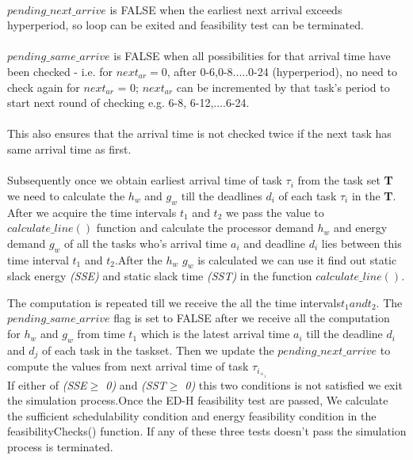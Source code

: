 \documentclass[12pt,hidelinks]{article}
\begin{document}
{\\$pending\_next\_arrive$ is FALSE when the earliest next arrival exceeds hyperperiod, so loop can be exited and feasibility test can be terminated.\\

\\$pending\_same\_arrive$  is FALSE when all possibilities for that arrival time have been checked - i.e. for $next_{ar} = 0$, after 0-6,0-8.....0-24 (hyperperiod), no need to check again for $next_{ar}$ = 0; $next_{ar}$ can be incremented by that task's period to start next round of checking e.g. 6-8, 6-12,....6-24.\\

\\This also ensures that the arrival time is not checked twice if the next task has same arrival time as first.\\

\\Subsequently once we obtain earliest arrival time of task {$\tau_i$} from the task set \textbf{T} we need to calculate the \textit{$h_w$} and \textit{$g_w$} till the deadlines {$d_i$} of each task {$\tau_i$} in the \textbf{T}.\\


After we acquire the time intervals $t_1 $ and $ t_2$ we pass the value to $calculate\_line()$ function and  calculate the  processor demand \textit{$h_w$} and energy demand \textit{$g_w$}  of all the tasks who's arrival time {$a_i$} and deadline {$d_i$} lies between this time interval $t_1$ and $t_2$.After the \textit{$h_w$} \textit{$g_w$} is calculated we can use it find out static slack energy \textit{(SSE)} and static slack time \textit{(SST)} in the function $calculate\_line()$.\newline

The computation is repeated till we receive the all the time intervals$t_1 and t_2$. The $pending\_same\_arrive$ flag is set to FALSE after we receive all the computation for \textit{$h_w$} and \textit{$g_w$} from time $t_1$ which is the latest arrival time {$a_i$} till the deadline {$d_i$} and {$d_j$} of each task in the taskset. Then we update the $pending\_next\_arrive$ to compute the values from next arrival time of task {$\tau_i_+_1$}\\ 


If either of \textit{(SSE$\geq$ 0)} and \textit{(SST$\geq$ 0)} this two conditions is not satisfied we exit the simulation process.Once the ED-H feasibility test are passed, We calculate the sufficient schedulability condition and energy feasibility condition in the feasibilityChecks() function. If any of these three tests doesn't pass the simulation process is terminated.

}
\end{document}
